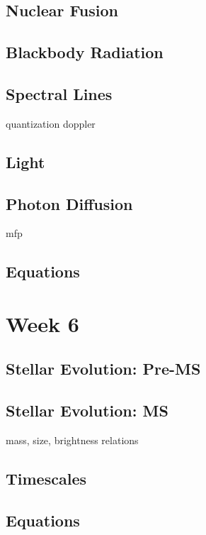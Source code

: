 \documentclass[a4paper,10pt]{article}
\begin{document}
\subsection{Nuclear Fusion}

\subsection{Blackbody Radiation}

\subsection{Spectral Lines}
quantization
doppler

\subsection{Light}

\subsection{Photon Diffusion}
mfp

\subsection{Equations}



\newpage
\section{Week 6}

\subsection{Stellar Evolution: Pre-MS}

\subsection{Stellar Evolution: MS}
mass, size, brightness relations

\subsection{Timescales}

\subsection{Equations}
\end{document}
